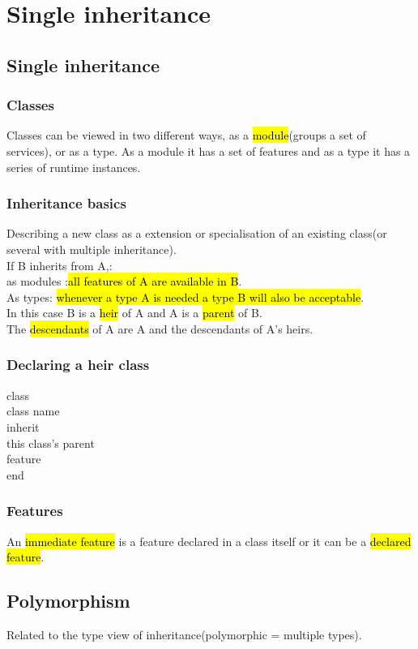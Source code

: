 \documentclass[11pt]{article}
\newcommand\tab[1][1cm]{\hspace*{#1}}
\begin{document}
\section{Single inheritance}
\subsection{Single inheritance}
\subsubsection{Classes}
Classes can be viewed in two different ways, as a \hl{module}(groups a set of services), or as a type. As a module it has a set of features and as a type it has a series of runtime instances.
\subsubsection{Inheritance basics}
Describing a new class as a extension or specialisation of an existing class(or several with multiple inheritance).\\If B inherits from A,:\\ as modules :\hl{all features of A are available in B}.\\ As types: \hl{whenever a type A is needed a type B will also be acceptable}.\\In this case B is a \hl{heir} of A and A is a \hl{parent} of B.\\The \hl{descendants} of A are A and the descendants of A's heirs.
\subsubsection{Declaring a heir class}
class\\\tab class name\\inherit\\\tab this class's parent\\feature\\end 
\subsubsection{Features}
An \hl{immediate feature} is a feature declared in a class itself or it can be a \hl{declared feature}.
\subsection{Polymorphism}
Related to the type view of inheritance(polymorphic = multiple types).
\end{document}
